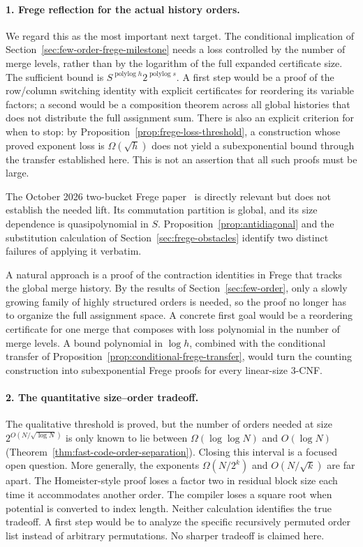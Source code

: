 \documentclass[11pt]{article}
\theoremstyle{definition}
\theoremstyle{remark}
\begin{document}
\paragraph{1. Frege reflection for the actual history orders.}
We regard this as the most important next target. The conditional
implication of Section~\ref{sec:few-order-frege-milestone} needs a loss
controlled by the number of merge levels, rather than by the logarithm
of the full expanded certificate size. The sufficient bound is
$S^{\operatorname{polylog}h}2^{\operatorname{polylog}s}$.
A first step would be a proof of the row/column switching identity
with explicit certificates for reordering its variable factors; a
second would be a composition theorem across all global histories that
does not distribute the full assignment sum. There is also an explicit
criterion for when to stop: by Proposition~\ref{prop:frege-loss-threshold},
a construction whose proved exponent loss is $\Omega(\sqrt h)$ does
not yield a subexponential bound through the transfer established
here. This is not an assertion that all such proofs must be large.

The October 2026 two-bucket Frege paper~\cite{CCGM26} is directly
relevant but does not establish the needed lift. Its commutation
partition is global, and its size dependence is quasipolynomial in
$S$. Proposition~\ref{prop:antidiagonal} and the substitution
calculation of Section~\ref{sec:frege-obstacles} identify two distinct
failures of applying it verbatim.

A natural approach is a proof of the contraction identities in Frege
that tracks the global merge history. By the results of
Section~\ref{sec:few-order}, only a slowly growing family of highly
structured orders is needed, so the proof no longer has to organize
the full assignment space. A concrete first goal would be a
reordering certificate for one merge that composes with loss
polynomial in the number of merge levels. A bound polynomial in
$\log h$, combined with the conditional transfer of
Proposition~\ref{prop:conditional-frege-transfer}, would turn the
counting construction into subexponential Frege proofs for every
linear-size 3-CNF.

\paragraph{2. The quantitative size--order tradeoff.}
The qualitative threshold is proved, but the number of orders needed
at size $2^{O(N/\sqrt{\log N})}$ is only known to lie between
$\Omega(\log\log N)$ and $O(\log N)$
(Theorem~\ref{thm:fast-code-order-separation}). Closing this interval
is a focused open question. More generally, the exponents
$\Omega(N/2^k)$ and $O(N/\sqrt k)$ are far apart.
The Homeister-style proof loses a factor two in residual block size
each time it accommodates another order. The compiler loses a square
root when potential is converted to index length. Neither calculation
identifies the true tradeoff. A first step would be to analyze the
specific recursively permuted order list instead of arbitrary
permutations. No sharper tradeoff is claimed here.
\end{document}
